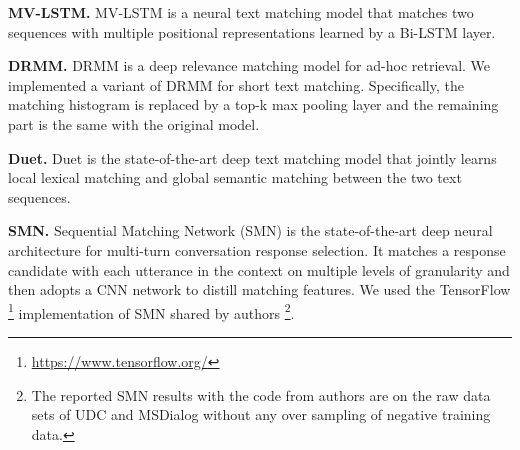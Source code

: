  \textbf{MV-LSTM.} MV-LSTM \cite{DBLP:conf/aaai/WanLGXPC16} is a neural text matching model that matches two sequences with multiple positional representations learned by a Bi-LSTM layer. 

 
 \textbf{DRMM.} DRMM \cite{Guo:2016:DRM:2983323.2983769} is a deep relevance matching model for ad-hoc retrieval. We implemented a variant of DRMM for short text matching. Specifically, the matching histogram is replaced by a top-k max pooling layer and the remaining part is the same with the original model.
 
 \textbf{Duet.} Duet \cite{Mitra:2017:LMU:3038912.3052579} is the state-of-the-art deep text matching model that jointly learns local lexical matching and global semantic matching between the two text sequences. 


 \textbf{SMN.} Sequential Matching Network (SMN) \cite{DBLP:conf/acl/WuWXZL17} is the state-of-the-art deep neural architecture for multi-turn conversation response selection. It matches a response candidate with each utterance in the context on multiple levels of granularity and then adopts a CNN network to distill matching features. We used the TensorFlow \footnote{\url{https://www.tensorflow.org/}} implementation of SMN shared by authors \cite{DBLP:conf/acl/WuWXZL17} \footnote{The reported SMN results with the code from authors are on the raw data sets of UDC and MSDialog without any over sampling of negative training data.}.

